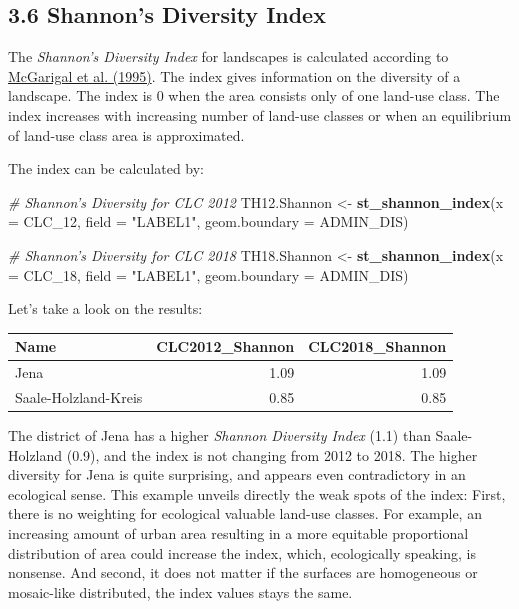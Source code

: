 \documentclass[]{article}
\newenvironment{Shaded}{\begin{snugshade}}{\end{snugshade}}
\newcommand{\KeywordTok}[1]{\textcolor[rgb]{0.13,0.29,0.53}{\textbf{#1}}}
\newcommand{\DataTypeTok}[1]{\textcolor[rgb]{0.13,0.29,0.53}{#1}}
\newcommand{\DecValTok}[1]{\textcolor[rgb]{0.00,0.00,0.81}{#1}}
\newcommand{\StringTok}[1]{\textcolor[rgb]{0.31,0.60,0.02}{#1}}
\newcommand{\CommentTok}[1]{\textcolor[rgb]{0.56,0.35,0.01}{\textit{#1}}}
\newcommand{\NormalTok}[1]{#1}
\begin{document}
\subsection{3.6 Shannon's Diversity
Index}\label{shannons-diversity-index}

The \emph{Shannon's Diversity Index} for landscapes is calculated
according to
\href{https://www.fs.usda.gov/treesearch/pubs/3064}{McGarigal et al.
(1995)}. The index gives information on the diversity of a landscape.
The index is 0 when the area consists only of one land-use class. The
index increases with increasing number of land-use classes or when an
equilibrium of land-use class area is approximated.

The index can be calculated by:

\begin{Shaded}
\begin{Highlighting}[]
\CommentTok{# Shannon's Diversity for CLC 2012}
\NormalTok{TH12.Shannon <-}\StringTok{ }\KeywordTok{st_shannon_index}\NormalTok{(}\DataTypeTok{x =}\NormalTok{ CLC_}\DecValTok{12}\NormalTok{, }\DataTypeTok{field =} \StringTok{"LABEL1"}\NormalTok{, }
                                 \DataTypeTok{geom.boundary =}\NormalTok{ ADMIN_DIS)}

\CommentTok{# Shannon's Diversity for CLC 2018}
\NormalTok{TH18.Shannon <-}\StringTok{ }\KeywordTok{st_shannon_index}\NormalTok{(}\DataTypeTok{x =}\NormalTok{ CLC_}\DecValTok{18}\NormalTok{, }\DataTypeTok{field =} \StringTok{"LABEL1"}\NormalTok{, }
                                 \DataTypeTok{geom.boundary =}\NormalTok{ ADMIN_DIS)}
\end{Highlighting}
\end{Shaded}

Let's take a look on the results:

\begin{longtable}[]{@{}lrr@{}}
\toprule
Name & CLC2012\_Shannon & CLC2018\_Shannon\tabularnewline
\midrule
\endhead
Jena & 1.09 & 1.09\tabularnewline
Saale-Holzland-Kreis & 0.85 & 0.85\tabularnewline
\bottomrule
\end{longtable}

The district of Jena has a higher \emph{Shannon Diversity Index} (1.1)
than Saale-Holzland (0.9), and the index is not changing from 2012 to
2018. The higher diversity for Jena is quite surprising, and appears
even contradictory in an ecological sense. This example unveils directly
the weak spots of the index: First, there is no weighting for ecological
valuable land-use classes. For example, an increasing amount of urban
area resulting in a more equitable proportional distribution of area
could increase the index, which, ecologically speaking, is nonsense. And
second, it does not matter if the surfaces are homogeneous or
mosaic-like distributed, the index values stays the same.
\end{document}

